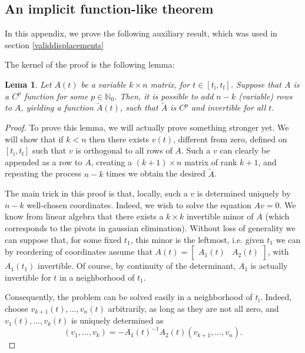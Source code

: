 \documentclass{article}
\theoremstyle{plain}
\newtheorem{lemma}{Lema}
\theoremstyle{plain}
\theoremstyle{nonumberplain}
\newtheorem{proof}{Dem}
\theoremstyle{empty}
\newcommand{\N}{\mathbb{N}}
\newcommand{\tstart}{\mathrm{i}}
\newcommand{\tend}{\mathrm{f}}
\begin{document}
\begin{appendices}

\section{An implicit function-like theorem}\label{buffift}

In this appendix, we prove the following auxiliary result, which was used in section \ref{validdisplacements}

\buffift*

The kernel of the proof is the following lemma:

\begin{lemma}\label{matrixlemma}
Let $A(t)$ be a variable $k \times n$ matrix, for $t \in [t_\tstart, t_\tend]$. Suppose that $A$ is a $C^p$ function for some $p \in \N_0$. Then, it is possible to add $n-k$ (variable) rows to $A$, yielding a function $\tilde A(t)$, such that $\tilde A$ is $C^p$ and invertible for all $t$.
\end{lemma}

\begin{proof}
To prove this lemma, we will actually prove something stronger yet. We will show that if $k < n$ then there exists $v(t)$, different from zero, defined on $[t_\tstart, t_\tend]$ such that $v$ is orthogonal to all rows of $A$. Such a $v$ can clearly be appended as a row to $A$, creating a $(k+1) \times n$ matrix of rank $k+1$, and repeating the process $n-k$ times we obtain the desired $\tilde A$.

The main trick in this proof is that, locally, such a $v$ is determined uniquely by $n-k$ well-chosen coordinates. Indeed, we wish to solve the equation $A v = 0$. We know from linear algebra that there exists a $k \times k$ invertible minor of $A$ (which corresponds to the pivots in gaussian elimination). Without loss of generality we can suppose that, for some fixed $t_1$, this minor is the leftmost, i.e. given $t_1$ we can by reordering of coordinates assume that $A(t) = \begin{bmatrix} A_1(t) & A_2(t) \end{bmatrix}$, with $A_1(t_1)$ invertible. Of course, by continuity of the determinant, $A_1$ is actually invertible for $t$ in a neighborhood of $t_1$.

Consequently, the problem can be solved easily in a neighborhood of $t_\tstart$. Indeed, choose $v_{k+1}(t), \dots, v_n(t)$ arbitrarily, as long as they are not all zero, and $v_1(t), \dots, v_k(t)$ is uniquely determined as
\[(v_1, \dots, v_k) = - A_1(t)^{-1} A_2(t) (v_{k+1}, \dots, v_n).\]


\end{proof}
\end{appendices}
\end{document}
